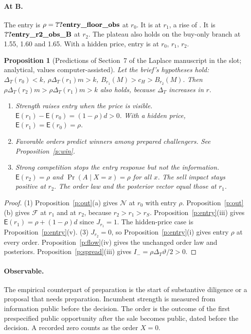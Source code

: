 \documentclass[12pt]{article}
\newtheorem{proposition}{Proposition}
\theoremstyle{definition}
\newcommand{\Ent}{\mathsf E}
\newcommand{\cH}{c_H}
\begin{document}
\paragraph{At B.}
The entry is $\rho=\reg{entry_floor_obs}$ at $r_0$.
It is  at $r_1$, a rise of .
It is $\reg{entry_r2_obs_B}$ at $r_2$.
The plateau  also holds on the buy-only branch at 1.55, 1.60 and 1.65.
With a hidden price, entry is  at $r_0$, $r_1$, $r_2$.

\begin{proposition}[Predictions of Section~7 of the Laplace manuscript in the slot; analytical, values computer-assisted]\label{p:sec7}
Let the brief's hypotheses hold: $\Delta_T(r_0)<k$, $\rho\Delta_T(r_1)m>k$, $B_{r_1}(M)>\cH>B_{r_2}(M)$.
Then $\rho\Delta_T(r_2)m>\rho\Delta_T(r_1)m>k$ also holds, because $\Delta_T$ increases in $r$.
\begin{enumerate}[label=(\arabic*)]
\item \emph{Strength raises entry when the price is visible.} $\Ent(r_1)-\Ent(r_0)=(1-\rho)d>0$. With a hidden price, $\Ent(r_1)=\Ent(r_0)=\rho$.
\item \emph{Favorable orders predict winners among prepared challengers.} See Proposition~\ref{p:win}.
\item \emph{Strong competition stops the entry response but not the information.} $\Ent(r_2)=\rho$ and $\Pr(A\mid X=x)=\rho$ for all $x$. The sell impact stays positive at $r_2$. The order law and the posterior vector equal those at $r_1$.
\end{enumerate}
\end{proposition}

\begin{proof}
(1) Proposition~\ref{p:out}(a) gives $\mathcal N$ at $r_0$ with entry $\rho$.
Proposition~\ref{p:out}(b) gives $\mathcal F$ at $r_1$ and at $r_2$, because $r_2>r_1>r_S$.
Proposition~\ref{p:entry}(iii) gives $\Ent(r_1)=\rho+(1-\rho)d$ since $J_{r_1}=1$.
The hidden-price case is Proposition~\ref{p:entry}(v).
(3) $J_{r_2}=0$, so Proposition~\ref{p:entry}(i) gives entry $\rho$ at every order.
Proposition~\ref{p:flow}(iv) gives the unchanged order law and posteriors.
Proposition~\ref{p:spread}(iii) gives $I_-=\rho\Delta_T\vartheta/2>0$.
\end{proof}

\paragraph{Observable.}
The empirical counterpart of preparation is the start of substantive diligence or a proposal that needs preparation.
Incumbent strength is measured from information public before the decision.
The order is the outcome of the first prespecified public opportunity after the sale becomes public, dated before the decision.
A recorded zero counts as the order $X=0$.
\end{document}
